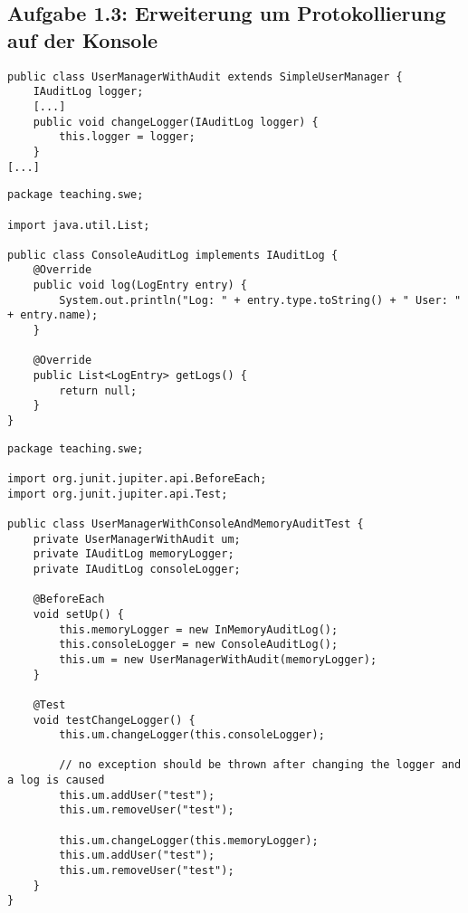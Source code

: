 \subsection*{Aufgabe 1.3: Erweiterung um Protokollierung auf der Konsole}

\begin{lstlisting}[style=javastyle, caption={Erweiterung der UserManagerWithAudit Klasse um eine changeLogger Methode}]
public class UserManagerWithAudit extends SimpleUserManager {
    IAuditLog logger;
    [...]
    public void changeLogger(IAuditLog logger) {
        this.logger = logger;
    }
[...]
\end{lstlisting}
\begin{lstlisting}[style=javastyle, caption={ConsoleAuditLog zur Protokollierung auf der Konsole}]
package teaching.swe;

import java.util.List;

public class ConsoleAuditLog implements IAuditLog {
    @Override
    public void log(LogEntry entry) {
        System.out.println("Log: " + entry.type.toString() + " User: " + entry.name);
    }

    @Override
    public List<LogEntry> getLogs() {
        return null;
    }
}

\end{lstlisting}
\begin{lstlisting}[style=javastyle, caption={Tests für die changeLogger() Methode}]
package teaching.swe;

import org.junit.jupiter.api.BeforeEach;
import org.junit.jupiter.api.Test;

public class UserManagerWithConsoleAndMemoryAuditTest {
    private UserManagerWithAudit um;
    private IAuditLog memoryLogger;
    private IAuditLog consoleLogger;

    @BeforeEach
    void setUp() {
        this.memoryLogger = new InMemoryAuditLog();
        this.consoleLogger = new ConsoleAuditLog();
        this.um = new UserManagerWithAudit(memoryLogger);
    }

    @Test
    void testChangeLogger() {
        this.um.changeLogger(this.consoleLogger);

        // no exception should be thrown after changing the logger and a log is caused
        this.um.addUser("test");
        this.um.removeUser("test");

        this.um.changeLogger(this.memoryLogger);
        this.um.addUser("test");
        this.um.removeUser("test");
    }
}
\end{lstlisting}